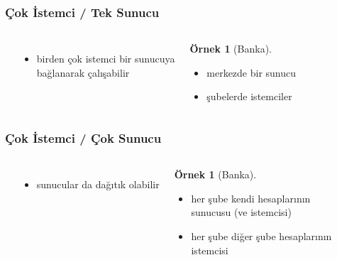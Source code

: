\documentclass[dvipsnames]{beamer}
\theoremstyle{definition}
\theoremstyle{example}
\newtheorem{ornek}[theorem]{Örnek}
\theoremstyle{plain}
\begin{document}
\begin{frame}
  \frametitle{Çok İstemci / Tek Sunucu}

  \begin{columns}
    \begin{center}
    \end{center}

    \begin{itemize}
      \item birden çok istemci bir sunucuya\\
        bağlanarak çalışabilir
    \end{itemize}

    \pause
    \bigskip
    \begin{ornek}[Banka]
      \begin{itemize}
        \item merkezde bir sunucu
        \item şubelerde istemciler
      \end{itemize}
    \end{ornek}
  \end{columns}
\end{frame}

\begin{frame}
  \frametitle{Çok İstemci / Çok Sunucu}

  \begin{columns}
    \begin{center}
    \end{center}

    \begin{itemize}
      \item sunucular da dağıtık olabilir
    \end{itemize}

    \pause
    \bigskip
    \begin{ornek}[Banka]
      \begin{itemize}
        \item her şube kendi hesaplarının\\
          sunucusu (ve istemcisi)
        \item her şube diğer şube hesaplarının\\
          istemcisi
      \end{itemize}
    \end{ornek}
  \end{columns}
\end{frame}
\end{document}
